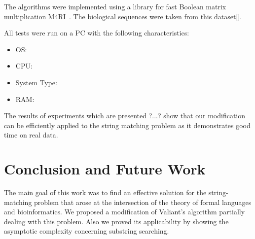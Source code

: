 \documentclass[runningheads]{llncs}
\begin{document}
The algorithms were implemented using a library for fast Boolean matrix multiplication M4RI~\cite{m4ri}. The biological sequences were taken from this dataset[]. 

All tests were run on a PC with the following characteristics:
\begin{itemize}
\item OS:
\item CPU:
\item System Type:
\item RAM:
\end{itemize}

The results of experiments which are presented ?...? show that our modification can be efficiently applied to the string matching problem as it demonstrates good time on real data. 


\section{Conclusion and Future Work}

The main goal of this work was to find an effective solution for the string-matching problem that arose at the intersection of the theory of formal languages and bioinformatics. We proposed a modification of Valiant's algorithm partially dealing with this problem. Also we proved its applicability by showing the asymptotic complexity concerning substring searching. 
\end{document}
